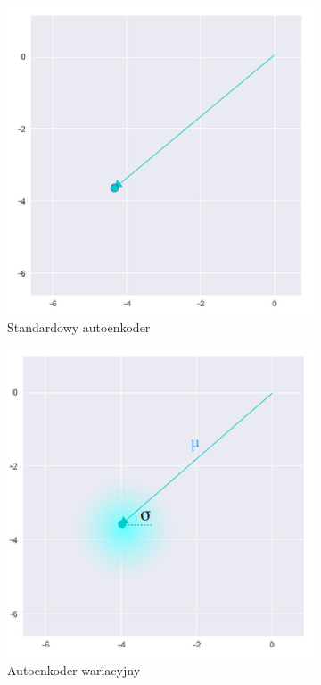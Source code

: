 \begin{figure}[h!]
  \centering
  \begin{subfigure}[b]{0.4\linewidth}
    \includegraphics[width=1.0\textwidth]{images/vae_vs_stand_a}
    \caption{Standardowy autoenkoder}
  \end{subfigure}
  \begin{subfigure}[b]{0.4\linewidth}
    \includegraphics[width=1.0\textwidth]{images/vae_vs_stand_b}
    \caption{Autoenkoder wariacyjny}
  \end{subfigure}
  \caption{}
  \label{fig:vae_vs_stand}
\end{figure}

